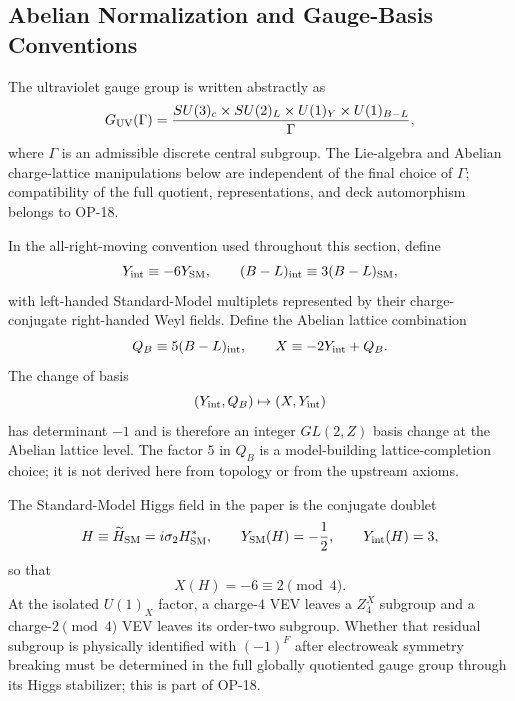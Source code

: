 \documentclass[11pt]{article}
\theoremstyle{canonmath}
\theoremstyle{canonpostulate}
\theoremstyle{canonclaim}
\def\mathbb#1{#1}%
\begin{document}
\subsection{Abelian Normalization and Gauge-Basis Conventions}
The ultraviolet gauge group is written abstractly as
\begin{equation}
G_{\rm UV}(\Gamma)=\frac{SU(3)_c\times SU(2)_L\times U(1)_Y\times U(1)_{B-L}}{\Gamma},
\end{equation}
where $\Gamma$ is an admissible discrete central subgroup. The Lie-algebra and Abelian charge-lattice manipulations below are independent of the final choice of $\Gamma$; compatibility of the full quotient, representations, and deck automorphism belongs to OP-18.

In the all-right-moving convention used throughout this section, define
\begin{equation}
Y_{\rm int}\equiv-6Y_{\rm SM},\qquad (B-L)_{\rm int}\equiv3(B-L)_{\rm SM},
\end{equation}
with left-handed Standard-Model multiplets represented by their charge-conjugate right-handed Weyl fields. Define the Abelian lattice combination
\begin{equation}
Q_B\equiv5(B-L)_{\rm int},\qquad X\equiv-2Y_{\rm int}+Q_B.
\end{equation}
The change of basis
\begin{equation}
(Y_{\rm int},Q_B)\mapsto(X,Y_{\rm int})
\end{equation}
has determinant $-1$ and is therefore an integer $GL(2,\mathbb Z)$ basis change at the Abelian lattice level. The factor $5$ in $Q_B$ is a model-building lattice-completion choice; it is not derived here from topology or from the upstream axioms.

The Standard-Model Higgs field in the paper is the conjugate doublet
\begin{equation}
H\equiv\widetilde H_{\rm SM}=i\sigma_2 H_{\rm SM}^*,\qquad Y_{\rm SM}(H)=-\frac12,\qquad Y_{\rm int}(H)=3,
\end{equation}
so that
\begin{equation}
X(H)=-6\equiv2\pmod4.
\end{equation}
At the isolated $U(1)_X$ factor, a charge-$4$ VEV leaves a $\mathbb Z_4^X$ subgroup and a charge-$2\pmod4$ VEV leaves its order-two subgroup. Whether that residual subgroup is physically identified with $(-1)^F$ after electroweak symmetry breaking must be determined in the full globally quotiented gauge group through its Higgs stabilizer; this is part of OP-18.
\end{document}
